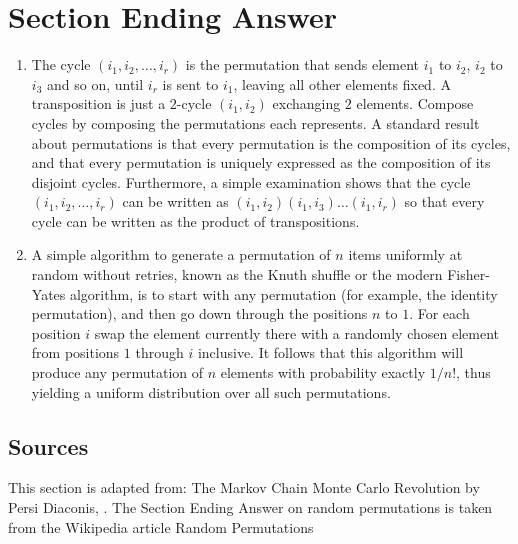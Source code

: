 \documentclass[12pt]{article}
\begin{document}
\section*{Section Ending Answer}
\begin{enumerate}
    \item
        The cycle \( (i_1, i_2, \dots, i_r) \) is the permutation that
        sends element \( i_1 \) to \( i_2 \), \( i_2 \) to \( i_3 \) and
        so on, until \( i_r \) is sent to \( i_1 \), leaving all other
        elements fixed.  A transposition is just a \( 2 \)-cycle \( (i_1,
        i_2) \) exchanging \( 2 \) elements. Compose cycles by composing
        the permutations each represents.  A standard result about
        permutations is that every permutation is the composition of its
        cycles, and that every permutation is uniquely expressed as the
        composition of its disjoint cycles. Furthermore, a simple
        examination shows that the cycle \( (i_1, i_2, \dots, i_r) \)
        can be written as \( (i_1, i_2 )(i_1, i_3)\dots (i_1,i_r) \) so
        that every cycle can be written as the product of
        transpositions.
    \item
        A simple algorithm to generate a permutation of \( n \) items
        uniformly at random without retries, known as the Knuth shuffle
        or the modern Fisher-Yates algorithm, is to start with any
        permutation (for example, the identity permutation), and then go
        down through the positions \( n \) to \( 1 \).  For each
        position \( i \) swap the element currently there with a
        randomly chosen element from positions \( 1 \) through \( i \)
        inclusive.  It follows that this algorithm will produce any
        permutation of \( n \) elements with probability exactly \( 1/n!
        \), thus yielding a uniform distribution over all such
        permutations.
\end{enumerate}

\subsection*{Sources} This section is adapted from:  The Markov Chain
Monte Carlo Revolution by Persi Diaconis,
\cite{diaconis09}.  The Section Ending Answer on random permutations is
taken from the Wikipedia article 
{Random Permutations} %

\hr

\end{document}
